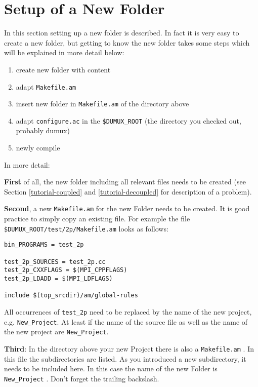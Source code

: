 \section{Setup of a New Folder}

In this section setting up a new folder is described. In fact it is very easy to create a new folder, but getting \Dumux to know the new folder takes some steps which will be explained in more detail below:

\begin{enumerate}
 \item create new folder with content
 \item adapt \verb+Makefile.am+
 \item insert new folder in \verb+Makefile.am+ of the directory above
 \item adapt \verb+configure.ac+ in the \verb+$DUMUX_ROOT+ (the directory you checked out, probably dumux)
 \item newly compile \Dumux
\end{enumerate}

\noindent In more detail:

\textbf{First} of all, the new folder including all relevant files needs to be created (see Section \ref{tutorial-coupled} and \ref{tutorial-decoupled} for description of a problem). 

\textbf{Second}, a new \verb+Makefile.am+ for the new Folder needs to be created. It is good practice to simply copy an existing file. For example the file \verb+$DUMUX_ROOT/test/2p/Makefile.am+ looks as follows:
\begin{verbatim}
bin_PROGRAMS = test_2p

test_2p_SOURCES = test_2p.cc
test_2p_CXXFLAGS = $(MPI_CPPFLAGS) 
test_2p_LDADD = $(MPI_LDFLAGS) 

include $(top_srcdir)/am/global-rules
\end{verbatim}

All occurrences of \verb+test_2p+ need to be replaced by the name of the new project, e.g. \verb+New_Project+. At least if the name of the source file as well as the name of the new project are \verb+New_Project+.

\textbf{Third}: In the directory above your new Project there is also a \verb+Makefile.am+ . In this file the subdirectories are listed. As you introduced a new subdirectory, it needs to be included here. In this case the name of the new Folder is \verb+New_Project+ . Don't forget the trailing backslash.

